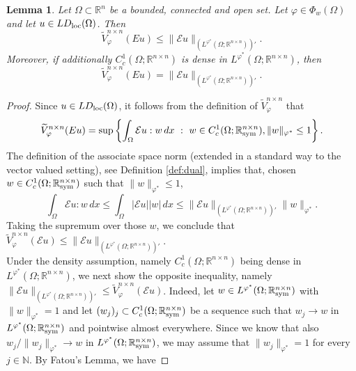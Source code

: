 \documentclass[a4paper,11pt,oneside,notitlepage]{article}
\newtheorem{lemma}[theorem]{Lemma}
\numberwithin{equation}{section}
\def\R{\mathbb{R}}
\def\N{\mathbb{N}}
\def\loc{{\rm loc}}
\def\sym{{\rm sym}}
\newcommand{\vphi}{\varphi}
\newcommand{\E}{\mathcal{E}}
\newcommand{\st}{ \ : \ }
\begin{document}
\begin{lemma}
\label{lem:BV-gradient}
    Let $\Omega \subset \R^n$ be a bounded, connected and open set. Let $\vphi \in \Phi_w(\Omega)$ and let $u \in LD_\loc(\Omega)$. Then
    \begin{equation*}
        \widetilde{V}^{n \times n}_\vphi(Eu) \le \| \E u \|_{(L^{\vphi^*}(\Omega; \R^{n \times n}))'}.
    \end{equation*}
    Moreover, if additionally $C^1_c(\Omega; \R^{n \times n})$ is dense in $L^{\vphi^*}(\Omega; \R^{n \times n})$, then
    \begin{equation*}
        \widetilde{V}^{n \times n}_\vphi(Eu) = \| \E u \|_{(L^{\vphi^*}(\Omega;\R^{n \times n}))'}.
    \end{equation*}
\end{lemma}
\begin{proof}
    Since $u \in LD_\loc(\Omega)$, it follows from the definition of $\widetilde{V}^{n \times n}_\vphi$ that 
    \begin{equation}
    \label{eq:integrationByParts}
        \widetilde{V}^{n \times n}_\vphi(Eu) = \sup \left\{ \int_\Omega \E u : w \, dx \st w \in C^1_c(\Omega; \R^{n \times n}_\sym), \|w\|_{\vphi^*} \le 1 \right\}. 
    \end{equation}
    The definition of the associate space norm (extended in a standard way to the vector valued setting), see Definition \ref{def:dual}, implies that, chosen $w \in C^1_c(\Omega; \R^{n \times n}_\sym)$ such that $\|w\|_{\vphi^*} \le 1$,
    \begin{equation*}
        \int_\Omega \E u : w \, dx \le \int_\Omega |\E u| |w| \, dx \le \| \E u\|_{(L^{\vphi^*}(\Omega;\R^{n \times n}))'} \|w\|_{\vphi^*}.
    \end{equation*}
    Taking the supremum over those $w$, we conclude that $\widetilde{V}^{n \times n}_\vphi(\E u) \le \|\E u\|_{(L^{\vphi^*}(\Omega;\R^{n \times n}))'}$. 
    \\
    Under the density assumption, namely $C^1_c(\Omega;\R^{n \times n})$ being dense in $L^{\vphi^*}(\Omega;\R^{n \times n})$, we next show the opposite inequality, namely $ \|\E u\|_{(L^{\vphi^*}(\Omega;\R^{n \times n}))'} \le \widetilde{V}^{n \times n}_\vphi(\E u)$. Indeed, let $w \in L^{\vphi^*}(\Omega; \R^{n \times n}_\sym)$ with $\|w\|_{\vphi^*} = 1$ and let $(w_j)_j \subset C^1_c(\Omega; \R^{n \times n}_\sym)$ be a sequence such that $w_j \to w$ in $L^{\vphi^*}(\Omega; \R^{n \times n}_\sym)$ and pointwise almost everywhere. Since we know that also $w_j/\|w_j\|_{\vphi^*} \to w$ in $L^{\vphi^*}(\Omega; \R^{n \times n}_\sym)$, we may assume that $\|w_j\|_{\vphi^*} = 1$ for every $j \in \N$. By Fatou's Lemma, we have

\end{proof}
\end{document}
